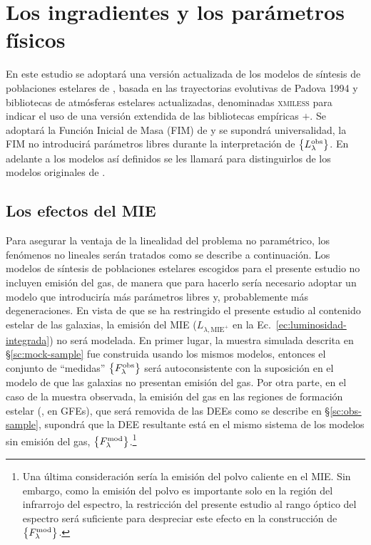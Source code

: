 
\section{Los ingradientes y los parámetros físicos}

En este estudio se adoptará una versión actualizada de los modelos de síntesis de poblaciones
estelares de , basada en las trayectorias evolutivas de Padova 1994
\citep{Alongi1993, Bressan1993, Fagotto1994a, Fagotto1994b, Girardi1996} y bibliotecas de atmósferas
estelares actualizadas, denominadas \textsc{xmiless} para indicar el uso de una versión extendida de
las bibliotecas empíricas \miles{}$+$\stelib \citep{SanchezBlazquez2006, LeBorgne2003}. Se adoptará
la Función Inicial de Masa (FIM) de \citet{Chabrier2003} y se supondrá universalidad, \ie la FIM no
introducirá parámetros libres durante la interpretación de $\set{\sedt{obs}}$. En adelante a los
modelos así definidos se les llamará  para distinguirlos de los modelos originales de \bc.

\subsection{Los efectos del MIE}

Para asegurar la ventaja de la linealidad del problema no paramétrico, los fenómenos no lineales
serán tratados como se describe a continuación. Los modelos de síntesis de poblaciones estelares
escogidos para el presente estudio no incluyen emisión del gas, de manera que para hacerlo sería
necesario adoptar un modelo \citep[\eg,][]{Charlot2001} que introduciría más parámetros libres y,
probablemente más degeneraciones. En vista de que se ha restringido el presente estudio al contenido
estelar de las galaxias, la emisión del MIE ($L_{\lambda,\text{MIE}^+}$ en la
Ec.~\ref{ec:luminosidad-integrada}) no será modelada. En primer lugar, la muestra simulada descrita
en \S\ref{sc:mock-sample} fue construida usando los mismos modelos, entonces el conjunto de
``medidas'' $\set{\sedt[F]{obs}}$ será autoconsistente con la suposición en el modelo de que las
galaxias no presentan emisión del gas. Por otra parte, en el caso de la muestra observada, la
emisión del gas en las regiones de formación estelar (\eg, en GFEs), que será removida de las DEEs
como se describe en \S\ref{sc:obs-sample}, supondrá que la DEE resultante está en el mismo sistema
de los modelos sin emisión del gas, $\set{\sedt[F]{mod}}$.\footnote{Una última consideración sería
la emisión del polvo caliente en el MIE. Sin embargo, como la emisión del polvo es importante solo
en la región del infrarrojo del espectro, la restricción del presente estudio al rango óptico del
espectro será suficiente para despreciar este efecto en la construcción de $\set{\sedt[F]{mod}}$.}

